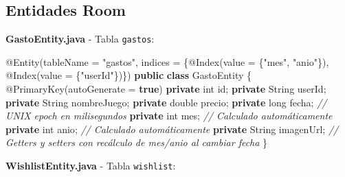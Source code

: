 \documentclass[
  spanish,
  11pt,
  paper=a4,
  ,captions=tableheading
]{scrartcl}
\newenvironment{Shaded}{}{}
\newcommand{\AttributeTok}[1]{\textcolor[rgb]{0.49,0.56,0.16}{#1}}
\newcommand{\BuiltInTok}[1]{\textcolor[rgb]{0.00,0.50,0.00}{#1}}
\newcommand{\CommentTok}[1]{\textcolor[rgb]{0.38,0.63,0.69}{\textit{#1}}}
\newcommand{\DataTypeTok}[1]{\textcolor[rgb]{0.56,0.13,0.00}{#1}}
\newcommand{\KeywordTok}[1]{\textcolor[rgb]{0.00,0.44,0.13}{\textbf{#1}}}
\newcommand{\NormalTok}[1]{#1}
\newcommand{\OperatorTok}[1]{\textcolor[rgb]{0.40,0.40,0.40}{#1}}
\newcommand{\StringTok}[1]{\textcolor[rgb]{0.25,0.44,0.63}{#1}}
\begin{document}
\hypertarget{entidades-room}{%
\subsection{Entidades Room}\label{entidades-room}}

\textbf{GastoEntity.java} - Tabla \texttt{gastos}:

\begin{Shaded}
\begin{Highlighting}[]
\AttributeTok{@Entity}\OperatorTok{(}\NormalTok{tableName }\OperatorTok{=} \StringTok{"gastos"}\OperatorTok{,}
\NormalTok{    indices }\OperatorTok{=} \OperatorTok{\{}\AttributeTok{@Index}\OperatorTok{(}\NormalTok{value }\OperatorTok{=} \OperatorTok{\{}\StringTok{"mes"}\OperatorTok{,} \StringTok{"anio"}\OperatorTok{\}),} \AttributeTok{@Index}\OperatorTok{(}\NormalTok{value }\OperatorTok{=} \OperatorTok{\{}\StringTok{"userId"}\OperatorTok{\})\})}
\KeywordTok{public} \KeywordTok{class}\NormalTok{ GastoEntity }\OperatorTok{\{}
    \AttributeTok{@PrimaryKey}\OperatorTok{(}\NormalTok{autoGenerate }\OperatorTok{=} \KeywordTok{true}\OperatorTok{)}
    \KeywordTok{private} \DataTypeTok{int}\NormalTok{ id}\OperatorTok{;}
    \KeywordTok{private} \BuiltInTok{String}\NormalTok{ userId}\OperatorTok{;}
    \KeywordTok{private} \BuiltInTok{String}\NormalTok{ nombreJuego}\OperatorTok{;}
    \KeywordTok{private} \DataTypeTok{double}\NormalTok{ precio}\OperatorTok{;}
    \KeywordTok{private} \DataTypeTok{long}\NormalTok{ fecha}\OperatorTok{;}  \CommentTok{// UNIX epoch en milisegundos}
    \KeywordTok{private} \DataTypeTok{int}\NormalTok{ mes}\OperatorTok{;}     \CommentTok{// Calculado automáticamente}
    \KeywordTok{private} \DataTypeTok{int}\NormalTok{ anio}\OperatorTok{;}    \CommentTok{// Calculado automáticamente}
    \KeywordTok{private} \BuiltInTok{String}\NormalTok{ imagenUrl}\OperatorTok{;}
    \CommentTok{// Getters y setters con recálculo de mes/anio al cambiar fecha}
\OperatorTok{\}}
\end{Highlighting}
\end{Shaded}

\textbf{WishlistEntity.java} - Tabla \texttt{wishlist}:
\end{document}

